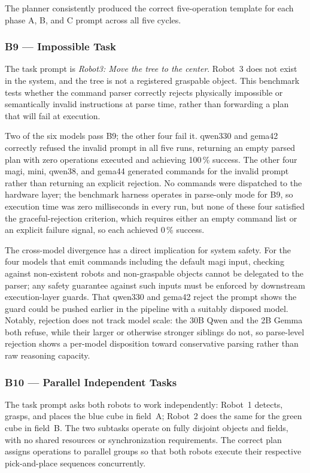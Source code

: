 \documentclass[
     12pt,
     a4paper,
     BCOR=10mm,
     DIV=14,
     listof=totoc,
     bibliography=totoc,
     parskip,
     twoside,
     headsepline
     ]{scrreprt}
\begin{document}
The planner consistently produced the correct five-operation template for each phase A, B, and C prompt across all five cycles.

\subsubsection{B9 --- Impossible Task}
The task prompt is \textit{Robot3: Move the tree to the center}. Robot~3 does not exist in the system, and the tree is not a registered graspable object. This benchmark tests whether the command parser correctly rejects physically impossible or semantically invalid instructions at parse time, rather than forwarding a plan that will fail at execution.

Two of the six models pass B9; the other four fail it. \gls{qwen330} and \gls{gema42} correctly refused the invalid prompt in all five runs, returning an empty parsed plan with zero operations executed and achieving 100\,\% success. The other four \gls{magi}, \gls{mini}, \gls{qwen38}, and \gls{gema44} generated commands for the invalid prompt rather than returning an explicit rejection. No commands were dispatched to the hardware layer; the benchmark harness operates in parse-only mode for B9, so execution time was zero milliseconds in every run, but none of these four satisfied the graceful-rejection criterion, which requires either an empty command list or an explicit failure signal, so each achieved 0\,\% success.

The cross-model divergence has a direct implication for system safety. For the four models that emit commands including the default \gls{magi} input, checking against non-existent robots and non-graspable objects cannot be delegated to the parser; any safety guarantee against such inputs must be enforced by downstream execution-layer guards. That \gls{qwen330} and \gls{gema42} reject the prompt shows the guard could be pushed earlier in the pipeline with a suitably disposed model. Notably, rejection does not track model scale: the 30B Qwen and the 2B Gemma both refuse, while their larger or otherwise stronger siblings do not, so parse-level rejection shows a per-model disposition toward conservative parsing rather than raw reasoning capacity.

\subsubsection{B10 --- Parallel Independent Tasks}
The task prompt asks both robots to work independently: Robot~1 detects, grasps, and places the blue cube in field~A; Robot~2 does the same for the green cube in field~B. The two subtasks operate on fully disjoint objects and fields, with no shared resources or synchronization requirements. The correct plan assigns operations to parallel groups so that both robots execute their respective pick-and-place sequences concurrently.
\end{document}
